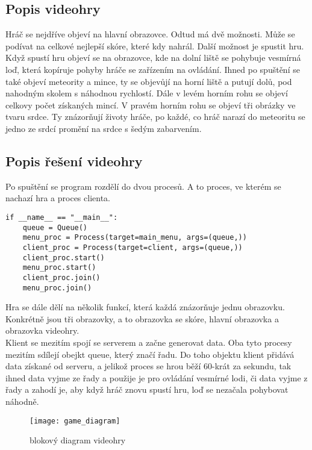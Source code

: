 \documentclass[12pt]{report}			%
\begin{document}
\subsection{Popis videohry}
Hráč se nejdříve objeví na hlavní obrazovce. Odtud má dvě možnosti. Může se podívat na celkové nejlepší skóre, které kdy nahrál. Další možnost je spustit hru. Když spustí hru objeví se na obrazovce, kde na dolní liště se pohybuje vesmírná loď, která kopíruje pohyby hráče se zařízením na ovládání. Ihned po spuštění se také objeví meteority a mince, ty se objevůjí na horní liště a putují dolů, pod nahodným skolem s náhodnou rychlostí. Dále v levém horním rohu se objeví celkovy počet získaných mincí. V pravém horním rohu se objeví tři obrázky ve tvaru srdce. Ty znázorňují životy hráče, po každé, co hráč narazí do meteoritu se jedno ze srdcí promění na srdce s šedým zabarvením. 


\subsection{Popis řešení videohry}
Po spuštění se program rozdělí do dvou procesů. A to proces, ve kterém se nachazí hra a proces clienta. 

\begin{lstlisting}[title={Program game.py}, caption={game.py}]
if __name__ == "__main__":
    queue = Queue() 
    menu_proc = Process(target=main_menu, args=(queue,)) 
    client_proc = Process(target=client, args=(queue,))  
    client_proc.start()
    menu_proc.start()
    client_proc.join()
    menu_proc.join()
\end{lstlisting}

Hra se dále dělí na několik funkcí, která každá znázorňuje jednu obrazovku. Konkrétně jsou tři obrazovky, a to obrazovka se skóre, hlavní obrazovka a obrazovka videohry.
\\
Klient se mezitím spojí se serverem a začne generovat data. Oba tyto procesy mezitím sdílejí obejkt queue, který značí řadu. Do toho objektu klient přidává data získané od serveru, a jelikož proces se hrou běží 60-krát za sekundu, tak ihned data vyjme ze řady a použije je pro ovládání vesmírné lodi, či data vyjme z řady a zahodí je, aby když hráč znovu spustí hru, loď se nezačala pohybovat náhodně.


\begin{figure}[h]
\caption{blokový diagram videohry}
\centering
\texttt{[image: game\_diagram]}
\end{figure}
\end{document}
